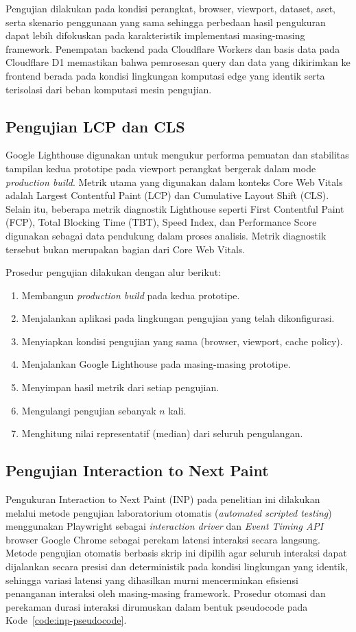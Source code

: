 \documentclass[12pt,a4paper]{report}
\begin{document}
Pengujian dilakukan pada kondisi perangkat, browser, viewport, dataset, aset, serta skenario penggunaan yang sama sehingga perbedaan hasil pengukuran dapat lebih difokuskan pada karakteristik implementasi masing-masing framework. Penempatan backend pada Cloudflare Workers dan basis data pada Cloudflare D1 memastikan bahwa pemrosesan query dan data yang dikirimkan ke frontend berada pada kondisi lingkungan komputasi edge yang identik serta terisolasi dari beban komputasi mesin pengujian.

\subsection{Pengujian LCP dan CLS}
\label{sec:pengujian-lcp-cls}
Google Lighthouse digunakan untuk mengukur performa pemuatan dan stabilitas tampilan kedua prototipe pada viewport perangkat bergerak dalam mode \textit{production build}. Metrik utama yang digunakan dalam konteks Core Web Vitals adalah Largest Contentful Paint (LCP) dan Cumulative Layout Shift (CLS). Selain itu, beberapa metrik diagnostik Lighthouse seperti First Contentful Paint (FCP), Total Blocking Time (TBT), Speed Index, dan Performance Score digunakan sebagai data pendukung dalam proses analisis. Metrik diagnostik tersebut bukan merupakan bagian dari Core Web Vitals.

Prosedur pengujian dilakukan dengan alur berikut:
\begin{enumerate}
    \item Membangun \textit{production build} pada kedua prototipe.
    \item Menjalankan aplikasi pada lingkungan pengujian yang telah dikonfigurasi.
    \item Menyiapkan kondisi pengujian yang sama (browser, viewport, cache policy).
    \item Menjalankan Google Lighthouse pada masing-masing prototipe.
    \item Menyimpan hasil metrik dari setiap pengujian.
    \item Mengulangi pengujian sebanyak $n$ kali.
    \item Menghitung nilai representatif (median) dari seluruh pengulangan.
\end{enumerate}

\subsection{Pengujian Interaction to Next Paint}
\label{sec:pengujian-inp}
Pengukuran Interaction to Next Paint (INP) pada penelitian ini dilakukan melalui metode pengujian laboratorium otomatis (\textit{automated scripted testing}) menggunakan Playwright sebagai \textit{interaction driver} dan \textit{Event Timing API} browser Google Chrome sebagai perekam latensi interaksi secara langsung. Metode pengujian otomatis berbasis skrip ini dipilih agar seluruh interaksi dapat dijalankan secara presisi dan deterministik pada kondisi lingkungan yang identik, sehingga variasi latensi yang dihasilkan murni mencerminkan efisiensi penanganan interaksi oleh masing-masing framework. Prosedur otomasi dan perekaman durasi interaksi dirumuskan dalam bentuk pseudocode pada Kode~\ref{code:inp-pseudocode}.
\end{document}
